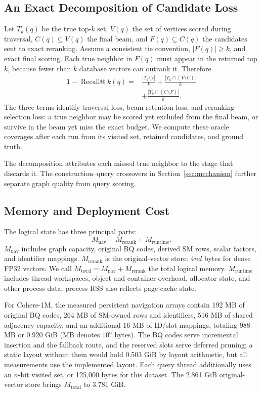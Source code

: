 \subsection{An Exact Decomposition of Candidate Loss}
Let $T_k(q)$ be the true top-$k$ set, $V(q)$ the set of vertices scored during traversal, $C(q)\subseteq V(q)$ the final beam, and $F(q)\subseteq C(q)$ the candidates sent to exact reranking. Assume a consistent tie convention, $|F(q)|\ge k$, and exact final scoring. Each true neighbor in $F(q)$ must appear in the returned top $k$, because fewer than $k$ database vectors can outrank it. Therefore
\begin{equation}
\begin{split}
1-\operatorname{Recall@}k(q)
={}&\frac{|T_k\setminus V|}{k}
 +\frac{|T_k\cap(V\setminus C)|}{k}\\
 &+\frac{|T_k\cap(C\setminus F)|}{k}.
\end{split}
\label{eq:decomposition}
\end{equation}
The three terms identify traversal loss, beam-retention loss, and reranking-selection loss: a true neighbor may be scored yet excluded from the final beam, or survive in the beam yet miss the exact budget. We compute these oracle coverages after each run from its visited set, retained candidates, and ground truth.

The decomposition attributes each missed true neighbor to the stage that discards it. The construction--query crossovers in Section~\ref{sec:mechanism} further separate graph quality from query scoring.

\subsection{Memory and Deployment Cost}
The logical state has three principal parts:
\begin{equation}
 M_{\mathrm{nav}}+M_{\mathrm{rerank}}+M_{\mathrm{runtime}}.
\end{equation}
$M_{\mathrm{nav}}$ includes graph capacity, original BQ codes, derived SM rows, scalar factors, and identifier mappings. $M_{\mathrm{rerank}}$ is the original-vector store: $4nd$ bytes for dense FP32 vectors. We call $M_{\mathrm{total}}=M_{\mathrm{nav}}+M_{\mathrm{rerank}}$ the total logical memory. $M_{\mathrm{runtime}}$ includes thread workspaces, object and container overhead, allocator state, and other process data; process RSS also reflects page-cache state.

For Cohere-1M, the measured persistent navigation arrays contain 192 MB of original BQ codes, 264 MB of SM-owned rows and identifiers, 516 MB of shared adjacency capacity, and an additional 16 MB of ID/slot mappings, totaling 988 MB or 0.920 GiB (MB denotes $10^6$ bytes). The BQ codes serve incremental insertion and the fallback route, and the reserved slots serve deferred pruning; a static layout without them would hold 0.503 GiB by layout arithmetic, but all measurements use the implemented layout. Each query thread additionally uses an $n$-bit visited set, or 125,000 bytes for this dataset. The 2.861 GiB original-vector store brings $M_{\mathrm{total}}$ to 3.781 GiB.


